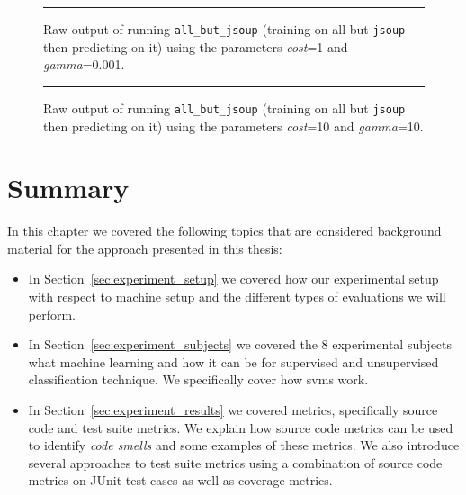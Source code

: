 \begin{landscape}
  \begin{figure}
    \centering
    \begin{minipage}{22.0cm}
    \scriptsize{
    
    }
    \end{minipage}
    \caption{Raw output of running \texttt{all\_but\_jsoup} (training on all but \texttt{jsoup} then predicting on it) using the parameters \emph{cost}=1 and \emph{gamma}=0.001.}
    \vspace{2mm}
    \hrule
    \label{fig:raw_output_bad}
  \end{figure}

  \begin{figure}
    \centering
    \begin{minipage}{22.0cm}
    \scriptsize{
    
    }
    \end{minipage}
    \caption{Raw output of running \texttt{all\_but\_jsoup} (training on all but \texttt{jsoup} then predicting on it) using the parameters \emph{cost}=10 and \emph{gamma}=10.}
    \vspace{2mm}
    \hrule
    \label{fig:raw_output_good}
  \end{figure}
\end{landscape}


\section{Summary}
\label{sec:experiment_summary}
In this chapter we covered the following topics that are considered background material for the approach presented in this thesis:

\begin{itemize}
  \item In Section~\ref{sec:experiment_setup} we covered how our experimental setup with respect to machine setup and the different types of evaluations we will perform.
  \item In Section~\ref{sec:experiment_subjects} we covered the 8 experimental subjects what machine learning and how it can be for supervised and unsupervised classification technique. We specifically cover how \gls{svm}s work.
  \item In Section~\ref{sec:experiment_results} we covered metrics, specifically source code and test suite metrics. We explain how source code metrics can be used to identify \emph{code smells} and some examples of these metrics. We also introduce several approaches to test suite metrics using a combination of source code metrics on JUnit test cases as well as coverage metrics.
\end{itemize}
